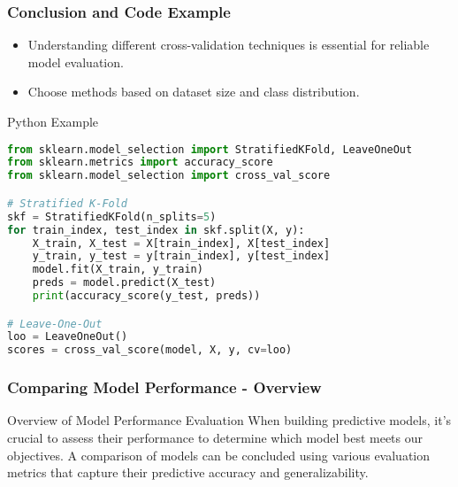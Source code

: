\documentclass[aspectratio=169]{beamer}
\begin{document}
\begin{frame}[fragile]
    \frametitle{Conclusion and Code Example}
    \begin{itemize}
        \item Understanding different cross-validation techniques is essential for reliable model evaluation.
        \item Choose methods based on dataset size and class distribution.
    \end{itemize}

    \begin{block}{Python Example}
        \begin{lstlisting}[language=Python]
from sklearn.model_selection import StratifiedKFold, LeaveOneOut
from sklearn.metrics import accuracy_score
from sklearn.model_selection import cross_val_score

# Stratified K-Fold
skf = StratifiedKFold(n_splits=5)
for train_index, test_index in skf.split(X, y):
    X_train, X_test = X[train_index], X[test_index]
    y_train, y_test = y[train_index], y[test_index]
    model.fit(X_train, y_train)
    preds = model.predict(X_test)
    print(accuracy_score(y_test, preds))

# Leave-One-Out
loo = LeaveOneOut()
scores = cross_val_score(model, X, y, cv=loo)
        \end{lstlisting}
    \end{block}
\end{frame}

\begin{frame}[fragile]
    \frametitle{Comparing Model Performance - Overview}
    \begin{block}{Overview of Model Performance Evaluation}
        When building predictive models, it's crucial to assess their performance to determine which model best meets our objectives. A comparison of models can be concluded using various evaluation metrics that capture their predictive accuracy and generalizability.
    \end{block}
\end{frame}
\end{document}
